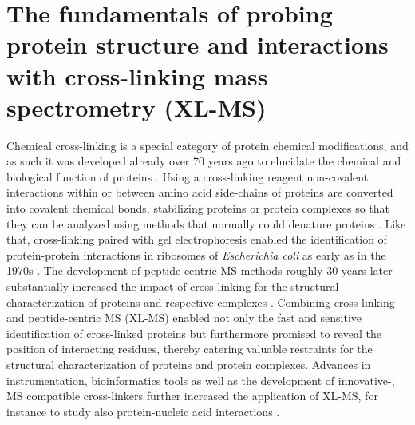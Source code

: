 \section{The fundamentals of probing protein structure and interactions with cross-linking mass spectrometry (XL-MS)}
Chemical cross-linking is a special category of protein chemical modifications, and as such it was developed already over 70 years ago to elucidate the chemical and biological function of proteins \cite{French_1945}. Using a cross-linking reagent non-covalent interactions within or between amino acid side-chains of proteins are converted into covalent chemical bonds, stabilizing proteins or protein complexes so that they can be analyzed using methods that normally could denature proteins \cite{Means_1998, Naowarojna_2021}. Like that, cross-linking paired with gel electrophoresis enabled the identification of protein-protein interactions in ribosomes of \emph{Escherichia coli} as early as in the 1970s \cite{Clegg_1974, Sun_1974}. The development of peptide-centric MS methods roughly 30 years later substantially increased the impact of cross-linking for the structural characterization of proteins and respective complexes \cite{Rappsilber_2011, Rappsilber_2000}. Combining cross-linking and peptide-centric MS (XL-MS) enabled not only the fast and sensitive identification of cross-linked proteins but furthermore promised to reveal the position of interacting residues, thereby catering valuable restraints for the structural characterization of proteins and protein complexes. Advances in instrumentation, bioinformatics tools as well as the development of innovative-, MS compatible cross-linkers further increased the application of XL-MS, for instance to study also protein-nucleic acid interactions \cite{Gotze_2021, Wong_1991}.

